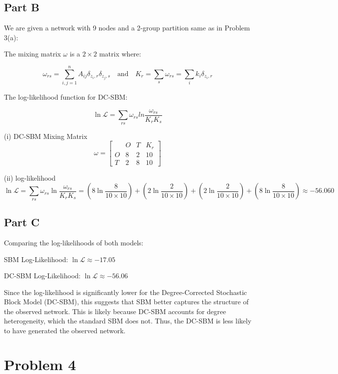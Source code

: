 \documentclass[12pt]{article}
\begin{document}
\subsection*{Part B}

We are given a network with 9 nodes and a 2-group partition same as in Problem 3(a):

The mixing matrix $\omega$ is a $2 \times 2$ matrix where:

$$
\omega_{rs} = \sum_{i,j=1}^n A_{ij}\delta_{z_i,r}\delta_{z_j,s} \quad \text{and} \quad K_r = \sum_s \omega_{rs} = \sum_i k_i \delta_{z_i, r}
$$

The log-likelihood function for DC-SBM:

$$
\ln \mathcal{L} = \sum_{rs} \omega_{rs} ln \frac{\omega_{rs}}{K_r K_s}
$$


(i) DC-SBM Mixing Matrix
$$
\omega = \begin{bmatrix} & O & T & K_r \\ O & 8 & 2 & 10 \\ T & 2 & 8 & 10\end{bmatrix}
$$

(ii) log-likelihood
$$
\ln \mathcal{L} = \sum_{rs} \omega_{rs} \ln \frac{\omega_{rs}}{K_r K_s} 

= (8 \ln \frac{8}{10 \times 10}) + (2 \ln \frac{2}{10 \times 10}) + (2 \ln \frac{2}{10 \times 10}) + (8 \ln \frac{8}{10 \times 10})

\approx -56.060
$$

\subsection*{Part C}

Comparing the log-likelihoods of both models:

SBM Log-Likelihood: $\ln \mathcal{L} \approx -17.05$

DC-SBM Log-Likelihood: $\ln \mathcal{L} \approx -56.06$

Since the log-likelihood is significantly lower for the Degree-Corrected Stochastic Block Model (DC-SBM), this suggests that SBM better captures the structure of the observed network. This is likely because DC-SBM accounts for degree heterogeneity, which the standard SBM does not. Thus, the DC-SBM is less likely to have generated the observed network.

\section*{Problem 4}
\end{document}

